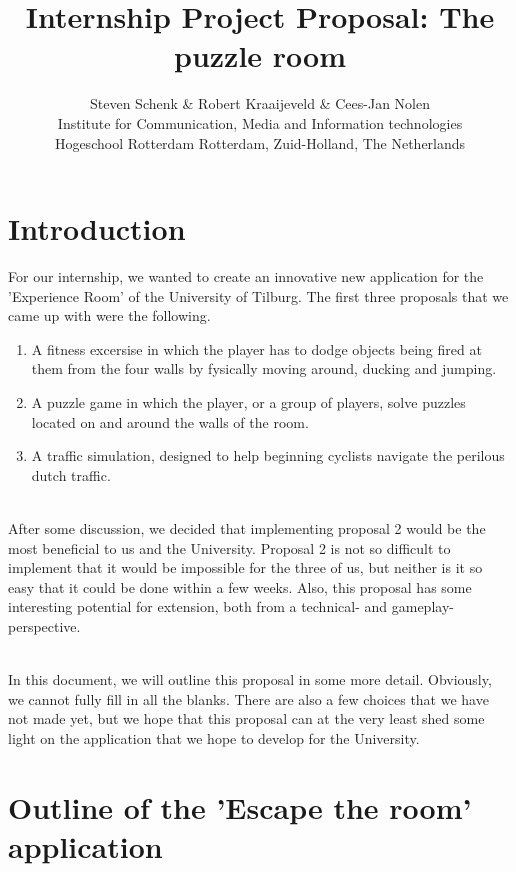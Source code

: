 \documentclass[11pt]{article}
\title{\Huge Internship Project Proposal: The puzzle room}
\author{Steven Schenk \& Robert Kraaijeveld \& Cees-Jan Nolen\\
	Institute for Communication, Media and Information technologies\\
	Hogeschool Rotterdam
	Rotterdam, Zuid-Holland, The Netherlands \\
	}
\begin{document}
\nocite{*}
\maketitle
{}
\rhead{}
\lfoot{}
\cfoot{}

\newpage
\tableofcontents
\pagebreak

\newpage
{}
{}
\section*{Introduction}
For our internship, we wanted to create an innovative new application for the 'Experience Room' of the University of Tilburg. The first three proposals that we came up with were the following.

\begin{enumerate}
\item A fitness excersise in which the player has to dodge objects being fired at them from the four walls by fysically moving around, ducking and jumping.
\item A puzzle game in which the player, or a group of players, solve puzzles located on and around the walls of the room.
\item A traffic simulation, designed to help beginning cyclists navigate the perilous dutch traffic.
\end{enumerate}

~\\
After some discussion, we decided that implementing proposal 2 would be the most beneficial to us and the University. Proposal 2 is not so difficult to implement that it would be impossible for the three of us, but neither is it so easy that it could be done within a few weeks. Also, this proposal has some interesting potential for extension, both from a technical- and gameplay-perspective. 

~\\
In this document, we will outline this proposal in some more detail. Obviously, we cannot fully fill in all the blanks. There are also a few choices that we have not made yet, but we hope that this proposal can at the very least shed some light on the application that we hope to develop for the University.

\newpage
{}
{}
\section*{Outline of the 'Escape the room' application}
\end{document}
